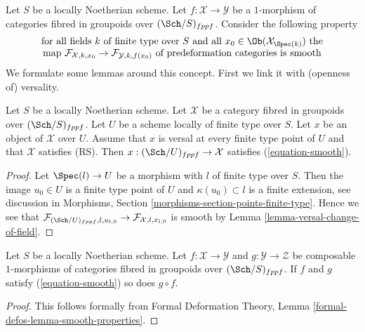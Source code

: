 \noindent
Let $S$ be a locally Noetherian scheme.
Let $f : \mathcal{X} \to \mathcal{Y}$ be a $1$-morphism of categories
fibred in groupoids over $(\Sch/S)_{fppf}$. Consider the following property
\begin{equation}
\label{equation-smooth}
\begin{matrix}
\text{for all fields }k\text{ of finite type over }S
\text{ and all }x_0 \in \Ob(\mathcal{X}_{\Spec(k)})\text{ the}\\
\text{map }
\mathcal{F}_{\mathcal{X}, k, x_0} \to \mathcal{F}_{\mathcal{Y}, k, f(x_0)}
\text{ of predeformation categories is smooth}
\end{matrix}
\end{equation}
We formulate some lemmas around this concept. First we link it with
(openness of) versality.

\begin{lemma}
\label{lemma-versal-smooth}
Let $S$ be a locally Noetherian scheme. Let $\mathcal{X}$ be a category
fibred in groupoids over $(\Sch/S)_{fppf}$. Let $U$ be a scheme locally
of finite type over $S$. Let $x$ be an object of $\mathcal{X}$ over $U$.
Assume that $x$ is versal at every finite type point of $U$ and that
$\mathcal{X}$ satisfies (RS). Then $x : (\Sch/U)_{fppf} \to \mathcal{X}$
satisfies (\ref{equation-smooth}).
\end{lemma}

\begin{proof}
Let $\Spec(l) \to U$ be a morphism with $l$ of finite type over $S$.
Then the image $u_0 \in U$ is a finite type point of $U$ and
$\kappa(u_0) \subset l$ is a finite extension, see discussion in
Morphisms, Section \ref{morphisms-section-points-finite-type}.
Hence we see that
$\mathcal{F}_{(\Sch/U)_{fppf}, l, u_{l, 0}} \to
\mathcal{F}_{\mathcal{X}, l, x_{l, 0}}$
is smooth by Lemma \ref{lemma-versal-change-of-field}.
\end{proof}

\begin{lemma}
\label{lemma-composition-smooth}
Let $S$ be a locally Noetherian scheme. Let $f : \mathcal{X} \to \mathcal{Y}$
and $g : \mathcal{Y} \to \mathcal{Z}$ be composable $1$-morphisms of
categories fibred in groupoids over $(\Sch/S)_{fppf}$. If $f$ and $g$
satisfy (\ref{equation-smooth}) so does $g \circ f$.
\end{lemma}

\begin{proof}
This follows formally from Formal Deformation Theory, Lemma
\ref{formal-defos-lemma-smooth-properties}.
\end{proof}

